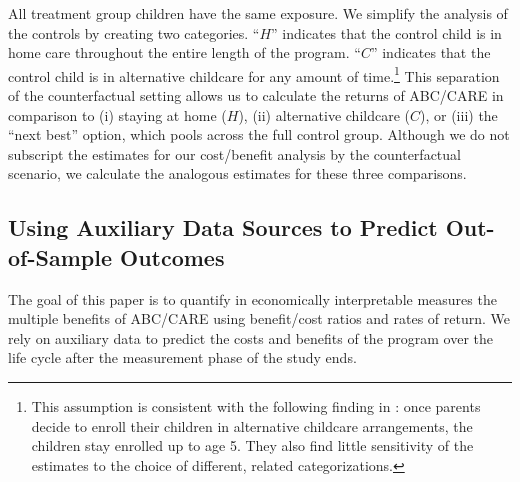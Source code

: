 All treatment group children have the same exposure. We simplify the analysis of the controls by creating two categories. ``$H$'' indicates that the control child is in home care throughout the entire length of the program. ``$C$'' indicates that the control child is in alternative childcare for any amount of time.\footnote{This assumption is consistent with the following finding in \cite{Garcia_Heckman_Ziff_2017_Gender-Diff_UNPUBLISHED}: once parents decide to enroll their children in alternative childcare arrangements, the children stay enrolled up to age 5. They also find little sensitivity of the estimates to the choice of different, related categorizations.}  This separation of the counterfactual setting allows us to calculate the returns of ABC/CARE in comparison to (i) staying at home ($H$), (ii) alternative childcare ($C$), or (iii) the ``next best'' option, which pools across the full control group. Although we do not subscript the estimates for our cost/benefit analysis by the counterfactual scenario, we calculate the analogous estimates for these three comparisons.

\subsection{Using Auxiliary Data Sources to Predict Out-of-Sample Outcomes}\label{sec:usingaux}

The goal of this paper is to quantify in economically interpretable measures the multiple benefits of ABC/CARE using benefit/cost ratios and rates of return. We rely on auxiliary data to predict the costs and benefits of the program over the life cycle after the measurement phase of the study ends.

